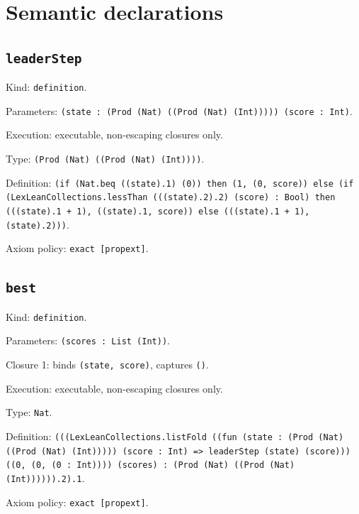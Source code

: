 \documentclass[11pt]{article}
\begin{document}
\section*{Semantic declarations}
\subsection*{\texttt{leaderStep}}
\noindent Kind: \texttt{definition}.\par
\noindent Parameters: \texttt{(state : (Prod (Nat) ((Prod (Nat) (Int))))) (score : Int)}.\par
\noindent Execution: executable, non-escaping closures only.\par
\noindent Type: \texttt{(Prod (Nat) ((Prod (Nat) (Int))))}.\par
\noindent Definition: \texttt{(if (Nat.beq ((state).1) (0)) then (1, (0, score)) else (if (LexLeanCollections.lessThan (((state).2).2) (score) : Bool) then (((state).1 + 1), ((state).1, score)) else (((state).1 + 1), (state).2)))}.\par
\noindent Axiom policy: \texttt{exact [propext]}.\par
\subsection*{\texttt{best}}
\noindent Kind: \texttt{definition}.\par
\noindent Parameters: \texttt{(scores : List (Int))}.\par
\noindent Closure 1: binds \texttt{(state, score)}, captures \texttt{()}.\par
\noindent Execution: executable, non-escaping closures only.\par
\noindent Type: \texttt{Nat}.\par
\noindent Definition: \texttt{(((LexLeanCollections.listFold ((fun (state : (Prod (Nat) ((Prod (Nat) (Int))))) (score : Int) => leaderStep (state) (score))) ((0, (0, (0 : Int)))) (scores) : (Prod (Nat) ((Prod (Nat) (Int)))))).2).1}.\par
\noindent Axiom policy: \texttt{exact [propext]}.\par
\end{document}
